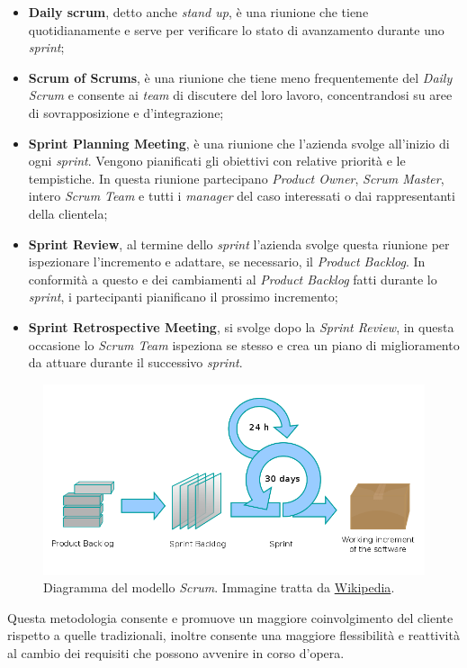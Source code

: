 \begin{itemize}
\item \textbf{Daily scrum}, detto anche \emph{stand up}, è una riunione che tiene quotidianamente e serve per verificare lo stato di avanzamento durante uno \emph{sprint};
\item \textbf{Scrum of Scrums}, è una riunione che tiene meno frequentemente del \emph{Daily Scrum} e consente ai \emph{team} di discutere del loro lavoro, concentrandosi su aree di sovrapposizione e d'integrazione;
\item \textbf{Sprint Planning Meeting}, è una riunione che l'azienda svolge all'inizio di ogni \emph{sprint}. Vengono pianificati gli obiettivi con relative priorità e le tempistiche. In questa riunione partecipano \emph{Product Owner}, \emph{Scrum Master}, intero \emph{Scrum Team} e tutti i \emph{manager} del caso interessati o dai rappresentanti della clientela;
\item \textbf{Sprint Review}, al termine dello \emph{sprint} l'azienda svolge questa riunione per ispezionare l'incremento e adattare, se necessario, il \emph{Product Backlog}. In conformità a questo e dei cambiamenti al \emph{Product Backlog} fatti durante lo \emph{sprint}, i partecipanti pianificano il prossimo incremento;
\item \textbf{Sprint Retrospective Meeting}, si svolge dopo la \emph{Sprint Review}, in questa occasione lo \emph{Scrum Team} ispeziona se stesso e crea un piano di miglioramento da attuare durante il successivo \emph{sprint}.
\end{itemize}
\begin{figure}[h]
\centering
\includegraphics[scale=0.35]{immagini/scrum}
\caption{Diagramma del modello \emph{Scrum}. Immagine tratta da \href{https://it.wikipedia.org/wiki/Scrum_(informatica)}{Wikipedia}.}
\label{fig:scrum}
\end{figure}
\newpage
Questa metodologia consente e promuove un maggiore coinvolgimento del cliente rispetto a quelle tradizionali, inoltre consente una maggiore flessibilità e reattività al cambio dei requisiti che possono avvenire in corso d'opera.




